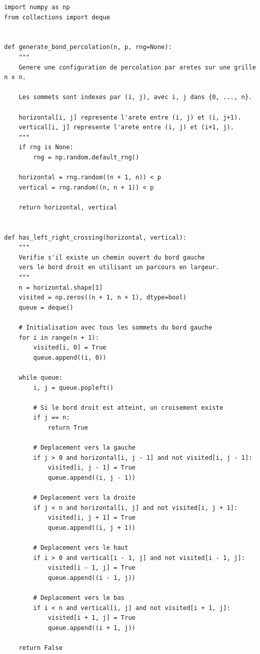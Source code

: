 \documentclass[11pt,a4paper]{report}
\begin{document}
\begin{lstlisting}[caption={Simulation de la percolation par aretes en Python},label={lst:percolation-python}]
import numpy as np
from collections import deque


def generate_bond_percolation(n, p, rng=None):
    """
    Genere une configuration de percolation par aretes sur une grille n x n.

    Les sommets sont indexes par (i, j), avec i, j dans {0, ..., n}.

    horizontal[i, j] represente l'arete entre (i, j) et (i, j+1).
    vertical[i, j] represente l'arete entre (i, j) et (i+1, j).
    """
    if rng is None:
        rng = np.random.default_rng()

    horizontal = rng.random((n + 1, n)) < p
    vertical = rng.random((n, n + 1)) < p

    return horizontal, vertical


def has_left_right_crossing(horizontal, vertical):
    """
    Verifie s'il existe un chemin ouvert du bord gauche
    vers le bord droit en utilisant un parcours en largeur.
    """
    n = horizontal.shape[1]
    visited = np.zeros((n + 1, n + 1), dtype=bool)
    queue = deque()

    # Initialisation avec tous les sommets du bord gauche
    for i in range(n + 1):
        visited[i, 0] = True
        queue.append((i, 0))

    while queue:
        i, j = queue.popleft()

        # Si le bord droit est atteint, un croisement existe
        if j == n:
            return True

        # Deplacement vers la gauche
        if j > 0 and horizontal[i, j - 1] and not visited[i, j - 1]:
            visited[i, j - 1] = True
            queue.append((i, j - 1))

        # Deplacement vers la droite
        if j < n and horizontal[i, j] and not visited[i, j + 1]:
            visited[i, j + 1] = True
            queue.append((i, j + 1))

        # Deplacement vers le haut
        if i > 0 and vertical[i - 1, j] and not visited[i - 1, j]:
            visited[i - 1, j] = True
            queue.append((i - 1, j))

        # Deplacement vers le bas
        if i < n and vertical[i, j] and not visited[i + 1, j]:
            visited[i + 1, j] = True
            queue.append((i + 1, j))

    return False



\end{lstlisting}
\end{document}
